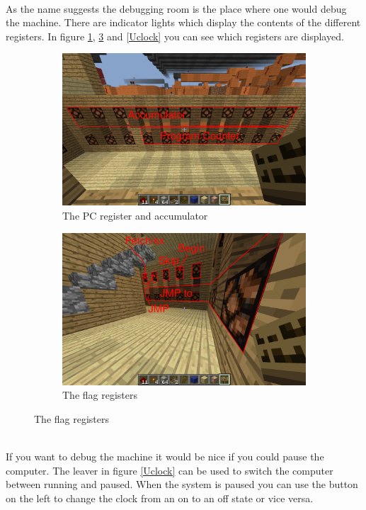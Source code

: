 \documentclass{article}
\begin{document}
~\\
As the name suggests the debugging room is the place where one would debug the machine. There are indicator lights which display the contents of the different registers. In figure \ref{PC}, \ref{Flag} and \ref{Uclock} you can see which registers are displayed.
\begin{figure}[h]
	\centering
	\begin{subfigure}{0.5\textwidth}
		\centering
		\includegraphics[width=\textwidth]{UI Acc and PC.png}
		\caption{The PC register and accumulator\label{PC}}
	\end{subfigure}\hfill
	\begin{subfigure}{0.5\textwidth}
		\centering
		\includegraphics[width=\textwidth]{Flags.png}
		\caption{The flag registers\label{Flag}}
	\end{subfigure}
\end{figure}
~\\
If you want to debug the machine it would be nice if you could pause the computer. The leaver in figure \ref{Uclock} can be used to switch the computer between running and paused. When the system is paused you can use the button on the left to change the clock from an on to an off state or vice versa.
\end{document}
